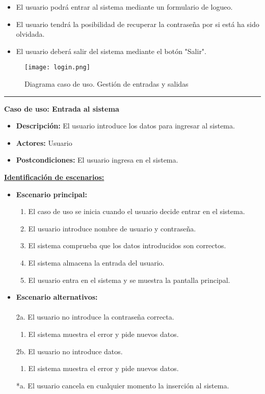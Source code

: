 \begin{itemize}
 \item El usuario podrá entrar al sistema mediante un formulario de logueo.
 \item El usuario tendrá la posibilidad de recuperar la contraseña por si está ha sido olvidada.
 \item El usuario deberá salir del sistema mediante el botón "Salir".

\end{itemize}
\begin{figure}[H]
  \centering
    \texttt{[image: login.png]}
  \caption{Diagrama caso de uso. Gestión de entradas y salidas}
  \label{cu8}
\end{figure}
\smallskip
\hrule height 1pt
\smallskip
\textbf{Caso de uso: Entrada al sistema}
\begin{itemize}\renewcommand{\labelitemi}{$\cdot$}
  \item \textbf{Descripción:} El usuario introduce los datos para ingresar al sistema.
  \item \textbf{Actores:} Usuario
  \item \textbf{Postcondiciones:} El usuario ingresa en el sistema.
\end{itemize}
\underline{\textbf{Identificación de escenarios:}}
\begin{itemize}\renewcommand{\labelitemi}{$\circ$}
 \item \textbf{Escenario principal:}
         \begin{enumerate}
          \item El caso de uso se inicia cuando el usuario decide entrar en el sistema.
          \item El usuario introduce nombre de usuario y contraseña.
          \item El sistema comprueba que los datos introducidos son correctos.
	  \item El sistema almacena la entrada del usuario.
          \item El usuario entra en el sistema y se muestra la pantalla principal.
         \end{enumerate}
  \item \textbf{Escenario alternativos:}\\\\
		2a. El usuario no introduce la contraseña correcta.
  			\begin{enumerate}
  			\item El sistema muestra el error y pide nuevos datos.
  			\end{enumerate}
		2b. El usuario no introduce datos.
  			\begin{enumerate}
  			\item El sistema muestra el error y pide nuevos datos.
  			\end{enumerate}
          *a. El usuario cancela en cualquier momento la inserción al sistema.
\end{itemize}

